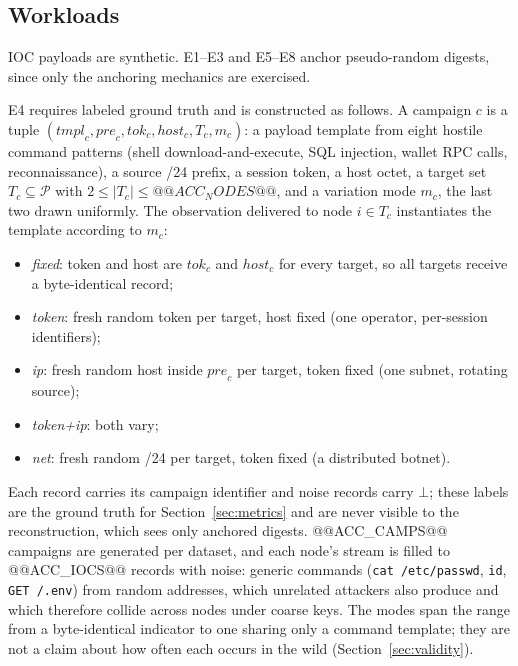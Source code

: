 \documentclass[conference]{IEEEtran}
\begin{document}
\subsection{Workloads}
IOC payloads are synthetic. E1--E3 and E5--E8 anchor pseudo-random digests, since only the anchoring mechanics are exercised.

E4 requires labeled ground truth and is constructed as follows. A campaign $c$ is a tuple $(\mathit{tmpl}_c, \mathit{pre}_c, \mathit{tok}_c, \mathit{host}_c, T_c, m_c)$: a payload template from eight hostile command patterns (shell download-and-execute, SQL injection, wallet RPC calls, reconnaissance), a source /24 prefix, a session token, a host octet, a target set $T_c\subseteq\mathcal{P}$ with $2\le|T_c|\le @@ACC_NODES@@$, and a variation mode $m_c$, the last two drawn uniformly. The observation delivered to node $i\in T_c$ instantiates the template according to $m_c$:
\begin{itemize}
\item \emph{fixed}: token and host are $\mathit{tok}_c$ and $\mathit{host}_c$ for every target, so all targets receive a byte-identical record;
\item \emph{token}: fresh random token per target, host fixed (one operator, per-session identifiers);
\item \emph{ip}: fresh random host inside $\mathit{pre}_c$ per target, token fixed (one subnet, rotating source);
\item \emph{token+ip}: both vary;
\item \emph{net}: fresh random /24 per target, token fixed (a distributed botnet).
\end{itemize}
Each record carries its campaign identifier and noise records carry $\bot$; these labels are the ground truth for Section~\ref{sec:metrics} and are never visible to the reconstruction, which sees only anchored digests. @@ACC_CAMPS@@ campaigns are generated per dataset, and each node's stream is filled to @@ACC_IOCS@@ records with noise: generic commands (\texttt{cat /etc/passwd}, \texttt{id}, \texttt{GET /.env}) from random addresses, which unrelated attackers also produce and which therefore collide across nodes under coarse keys. The modes span the range from a byte-identical indicator to one sharing only a command template; they are not a claim about how often each occurs in the wild (Section~\ref{sec:validity}).
\end{document}
